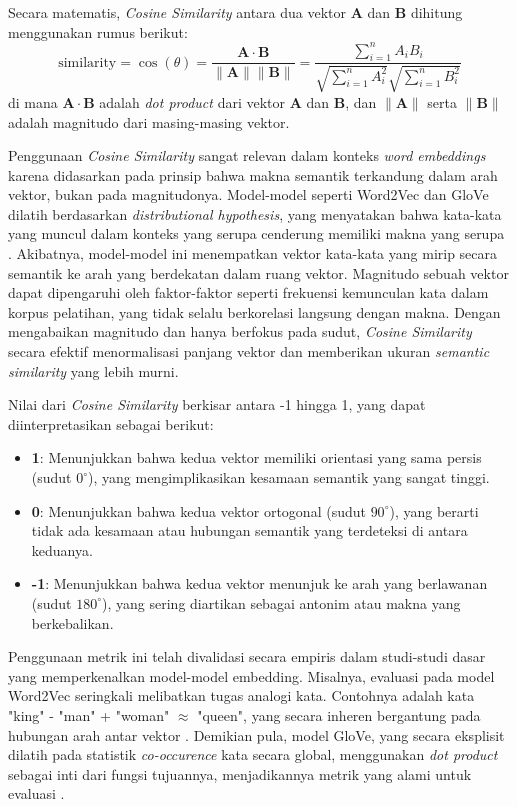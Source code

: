 Secara matematis, \textit{Cosine Similarity} antara dua vektor $\mathbf{A}$ dan $\mathbf{B}$ dihitung menggunakan rumus berikut:
$$\text{similarity} = \cos(\theta) = \frac{\mathbf{A} \cdot \mathbf{B}}{\|\mathbf{A}\| \|\mathbf{B}\|} = \frac{\sum_{i=1}^{n} A_i B_i}{\sqrt{\sum_{i=1}^{n} A_i^2} \sqrt{\sum_{i=1}^{n} B_i^2}}$$
di mana $\mathbf{A} \cdot \mathbf{B}$ adalah \textit{dot product} dari vektor $\mathbf{A}$ dan $\mathbf{B}$, dan $\|\mathbf{A}\|$ serta $\|\mathbf{B}\|$ adalah magnitudo dari masing-masing vektor.

Penggunaan \textit{Cosine Similarity} sangat relevan dalam konteks \textit{word embeddings} karena didasarkan pada prinsip bahwa makna semantik terkandung dalam arah vektor, bukan pada magnitudonya. Model-model seperti Word2Vec dan GloVe dilatih berdasarkan \textit{distributional hypothesis}, yang menyatakan bahwa kata-kata yang muncul dalam konteks yang serupa cenderung memiliki makna yang serupa \parencite{firth1957synopsis}. Akibatnya, model-model ini menempatkan vektor kata-kata yang mirip secara semantik ke arah yang berdekatan dalam ruang vektor. Magnitudo sebuah vektor dapat dipengaruhi oleh faktor-faktor seperti frekuensi kemunculan kata dalam korpus pelatihan, yang tidak selalu berkorelasi langsung dengan makna. Dengan mengabaikan magnitudo dan hanya berfokus pada sudut, \textit{Cosine Similarity} secara efektif menormalisasi panjang vektor dan memberikan ukuran \textit{semantic similarity} yang lebih murni.

Nilai dari \textit{Cosine Similarity} berkisar antara -1 hingga 1, yang dapat diinterpretasikan sebagai berikut:
\begin{itemize}
    \item \textbf{1}: Menunjukkan bahwa kedua vektor memiliki orientasi yang sama persis (sudut $0^\circ$), yang mengimplikasikan kesamaan semantik yang sangat tinggi.
    \item \textbf{0}: Menunjukkan bahwa kedua vektor ortogonal (sudut $90^\circ$), yang berarti tidak ada kesamaan atau hubungan semantik yang terdeteksi di antara keduanya.
    \item \textbf{-1}: Menunjukkan bahwa kedua vektor menunjuk ke arah yang berlawanan (sudut $180^\circ$), yang sering diartikan sebagai antonim atau makna yang berkebalikan.
\end{itemize}

Penggunaan metrik ini telah divalidasi secara empiris dalam studi-studi dasar yang memperkenalkan model-model embedding. Misalnya, evaluasi pada model Word2Vec seringkali melibatkan tugas analogi kata. Contohnya adalah kata "king" - "man" + "woman" $\approx$ "queen", yang secara inheren bergantung pada hubungan arah antar vektor \parencite{mikolov2013efficient}. Demikian pula, model GloVe, yang secara eksplisit dilatih pada statistik \textit{co-occurence} kata secara global, menggunakan \textit{dot product} sebagai inti dari fungsi tujuannya, menjadikannya metrik yang alami untuk evaluasi \parencite{pennington2014glove}.